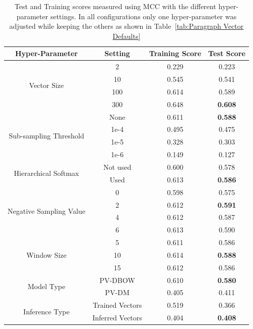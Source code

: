 \begin{table}[h]
  \begin{center}
    \begin{tabular}{ c | c | c | c }
      \toprule
      Hyper-Parameter & Setting & Training Score & Test Score \\
      \midrule
      \multirow{4}{*}{Vector Size}
       & 2 & 0.229 & 0.223 \\
       & 10  & 0.545 & 0.541 \\
       & 100 & 0.614 & 0.589 \\
       & 300 & 0.648 & \textbf{0.608} \\
      \midrule
      \multirow{4}{*}{Sub-sampling Threshold}
       & None & 0.611 & \textbf{0.588} \\
       & 1e-4 & 0.495 & 0.475 \\
       & 1e-5 & 0.328 & 0.303 \\
       & 1e-6 & 0.149 & 0.127 \\
      \midrule
      \multirow{2}{*}{Hierarchical Softmax}
       & Not used & 0.600 & 0.578 \\
       & Used     & 0.613 & \textbf{0.586} \\
      \midrule
      \multirow{4}{*}{Negative Sampling Value}
       & 0 & 0.598 & 0.575 \\
       & 2 & 0.612 & \textbf{0.591} \\
       & 4 & 0.612 & 0.587 \\
       & 6 & 0.613 & 0.590 \\
      \midrule
      \multirow{3}{*}{Window Size}
       & 5  & 0.611 & 0.586 \\
       & 10 & 0.614 & \textbf{0.588} \\
       & 15 & 0.612 & 0.586 \\
      \midrule
      \multirow{2}{*}{Model Type}
       & PV-DBOW & 0.610 & \textbf{0.580} \\
       & PV-DM   & 0.405 & 0.411 \\
      \midrule
      \multirow{2}{*}{Inference Type}
       & Trained Vectors  & 0.519 & 0.366 \\
       & Inferred Vectors & 0.404 & \textbf{0.408} \\
      \bottomrule
    \end{tabular}
  \caption{Test and Training scores measured using \gls{MCC} with the different hyper-parameter settings. In all configurations only one hyper-parameter was adjusted while keeping the others as shown in Table~\ref{tab:Paragraph Vector Defaults}}
\label{tab:Paragraph Vector Parameter Hyper-Parameter Results}
\end{center}
\end{table}

